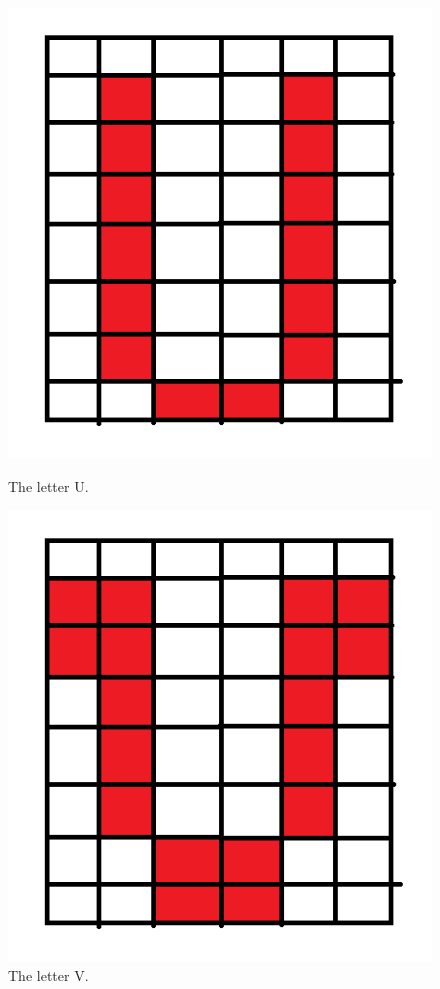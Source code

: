 \documentclass[journal]{./sty/IEEEtran}
\begin{document}
\begin{figure}
\centering
\includegraphics[scale=0.3]{imgs/U.png}
\caption{The letter U.\label{fig:U}}
\includegraphics[scale=0.3]{imgs/V.png}
\caption{The letter V.\label{fig:V}}
\end{figure}
\end{document}
